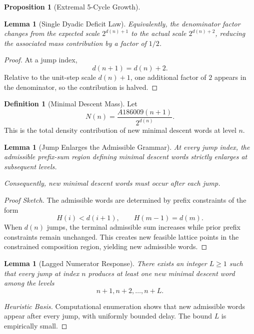 \documentclass[12pt, oneside]{article}
\numberwithin{equation}{section}
\theoremstyle{definition}
\newtheorem{definition}{Definition}[section]
\newtheorem{proposition}{Proposition}[section]
\theoremstyle{plain}
\newtheorem{lemma}[theorem]{Lemma}
\theoremstyle{remark}
\begin{document}
\begin{proposition}[Extremal 5-Cycle Growth]
\begin{lemma}[Single Dyadic Deficit Law]
Equivalently, the denominator factor changes from the expected scale
$2^{d(n)+1}$ to the actual scale $2^{d(n)+2}$, reducing the associated
mass contribution by a factor of $1/2$.
\end{lemma}

\begin{proof}
At a jump index,
\[
d(n+1)=d(n)+2.
\]
Relative to the unit-step scale $d(n)+1$, one additional factor of $2$
appears in the denominator, so the contribution is halved.
\end{proof}


\begin{definition}[Minimal Descent Mass]
Let
\[
N(n)=\frac{A186009(n+1)}{2^{d(n)}}.
\]
This is the total density contribution of new minimal descent words at
level $n$.
\end{definition}


\begin{lemma}[Jump Enlarges the Admissible Grammar]
\label{lem:jump-grammar}
At every jump index, the admissible prefix-sum region defining minimal
descent words strictly enlarges at subsequent levels.

Consequently, new minimal descent words must occur after each jump.
\end{lemma}

\begin{proof}[Proof Sketch]
The admissible words are determined by prefix constraints of the form
\[
H(i)<d(i+1), \qquad H(m-1)=d(m).
\]
When $d(n)$ jumps, the terminal admissible sum increases while prior
prefix constraints remain unchanged. This creates new feasible lattice
points in the constrained composition region, yielding new admissible
words.
\end{proof}


\begin{lemma}[Lagged Numerator Response]
\label{lem:lagged-response}
There exists an integer $L\ge1$ such that every jump at index $n$
produces at least one new minimal descent word among the levels
\[
n+1,n+2,\dots,n+L.
\]
\end{lemma}

\begin{proof}[Heuristic Basis]
Computational enumeration shows that new admissible words appear after
every jump, with uniformly bounded delay. The bound $L$ is empirically
small.
\end{proof}


\end{proposition}
\end{document}
